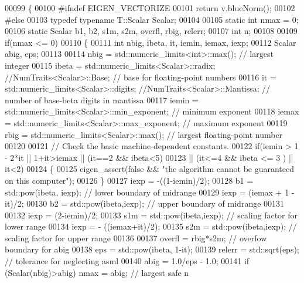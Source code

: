 \begin{DoxyCode}
00099 \{
00100 \textcolor{preprocessor}{  #ifndef EIGEN\_VECTORIZE}
00101   \textcolor{keywordflow}{return} v.blueNorm();
00102 \textcolor{preprocessor}{  #else}
00103   \textcolor{keyword}{typedef} \textcolor{keyword}{typename} T::Scalar Scalar;
00104 
00105   \textcolor{keyword}{static} \textcolor{keywordtype}{int} nmax = 0;
00106   \textcolor{keyword}{static} Scalar b1, b2, s1m, s2m, overfl, rbig, relerr;
00107   \textcolor{keywordtype}{int} n;
00108 
00109   \textcolor{keywordflow}{if}(nmax <= 0)
00110   \{
00111     \textcolor{keywordtype}{int} nbig, ibeta, it, iemin, iemax, iexp;
00112     Scalar abig, eps;
00113 
00114     nbig  = std::numeric\_limits<int>::max();            \textcolor{comment}{// largest integer}
00115     ibeta = std::numeric\_limits<Scalar>::radix; \textcolor{comment}{//NumTraits<Scalar>::Base;                    // base for
       floating-point numbers}
00116     it    = std::numeric\_limits<Scalar>::digits; \textcolor{comment}{//NumTraits<Scalar>::Mantissa;                // number of
       base-beta digits in mantissa}
00117     iemin = std::numeric\_limits<Scalar>::min\_exponent;  \textcolor{comment}{// minimum exponent}
00118     iemax = std::numeric\_limits<Scalar>::max\_exponent;  \textcolor{comment}{// maximum exponent}
00119     rbig  = std::numeric\_limits<Scalar>::max();         \textcolor{comment}{// largest floating-point number}
00120 
00121     \textcolor{comment}{// Check the basic machine-dependent constants.}
00122     \textcolor{keywordflow}{if}(iemin > 1 - 2*it || 1+it>iemax || (it==2 && ibeta<5)
00123       || (it<=4 && ibeta <= 3 ) || it<2)
00124     \{
00125       eigen\_assert(\textcolor{keyword}{false} && \textcolor{stringliteral}{"the algorithm cannot be guaranteed on this computer"});
00126     \}
00127     iexp  = -((1-iemin)/2);
00128     b1    = std::pow(ibeta, iexp);  \textcolor{comment}{// lower boundary of midrange}
00129     iexp  = (iemax + 1 - it)/2;
00130     b2    = std::pow(ibeta,iexp);   \textcolor{comment}{// upper boundary of midrange}
00131 
00132     iexp  = (2-iemin)/2;
00133     s1m   = std::pow(ibeta,iexp);   \textcolor{comment}{// scaling factor for lower range}
00134     iexp  = - ((iemax+it)/2);
00135     s2m   = std::pow(ibeta,iexp);   \textcolor{comment}{// scaling factor for upper range}
00136 
00137     overfl  = rbig*s2m;          \textcolor{comment}{// overfow boundary for abig}
00138     eps     = std::pow(ibeta, 1-it);
00139     relerr  = std::sqrt(eps);      \textcolor{comment}{// tolerance for neglecting asml}
00140     abig    = 1.0/eps - 1.0;
00141     \textcolor{keywordflow}{if} (Scalar(nbig)>abig)  nmax = abig;  \textcolor{comment}{// largest safe n}

\end{DoxyCode}
